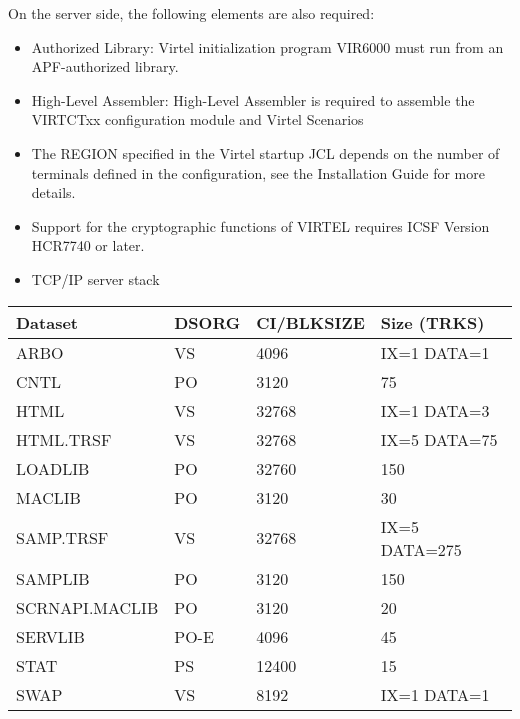 \documentclass[letterpaper,10pt,english]{sphinxmanual}
\begin{document}
On the server side, the following elements are also required:
\begin{itemize}
\item {} 
Authorized Library: Virtel initialization program VIR6000 must run from an APF-authorized library.

\item {} 
High-Level Assembler: High-Level Assembler is required to assemble the VIRTCTxx configuration module and Virtel Scenarios

\item {} 
The REGION specified in the Virtel startup JCL depends on the number of terminals defined in the configuration, see the Installation Guide for more details.

\item {} 
Support for the cryptographic functions of VIRTEL requires ICSF Version HCR7740 or later.

\item {} 
TCP/IP server stack

\end{itemize}



\begin{savenotes}\sphinxattablestart
\centering
\begin{tabulary}{\linewidth}[t]{|T|T|T|T|}
\hline
\sphinxstyletheadfamily 
Dataset
&\sphinxstyletheadfamily 
DSORG
&\sphinxstyletheadfamily 
CI/BLKSIZE
&\sphinxstyletheadfamily 
Size (TRKS)
\\
\hline
ARBO
&
VS
&
4096
&
IX=1  DATA=1
\\
\hline
CNTL
&
PO
&
3120
&
75
\\
\hline
HTML
&
VS
&
32768
&
IX=1  DATA=3
\\
\hline
HTML.TRSF
&
VS
&
32768
&
IX=5  DATA=75
\\
\hline
LOADLIB
&
PO
&
32760
&
150
\\
\hline
MACLIB
&
PO
&
3120
&
30
\\
\hline
SAMP.TRSF
&
VS
&
32768
&
IX=5  DATA=275
\\
\hline
SAMPLIB
&
PO
&
3120
&
150
\\
\hline
SCRNAPI.MACLIB
&
PO
&
3120
&
20
\\
\hline
SERVLIB
&
PO-E
&
4096
&
45
\\
\hline
STAT
&
PS
&
12400
&
15
\\
\hline
SWAP
&
VS
&
8192
&
IX=1  DATA=1
\\
\hline
\end{tabulary}
\par
\sphinxattableend\end{savenotes}
\end{document}
